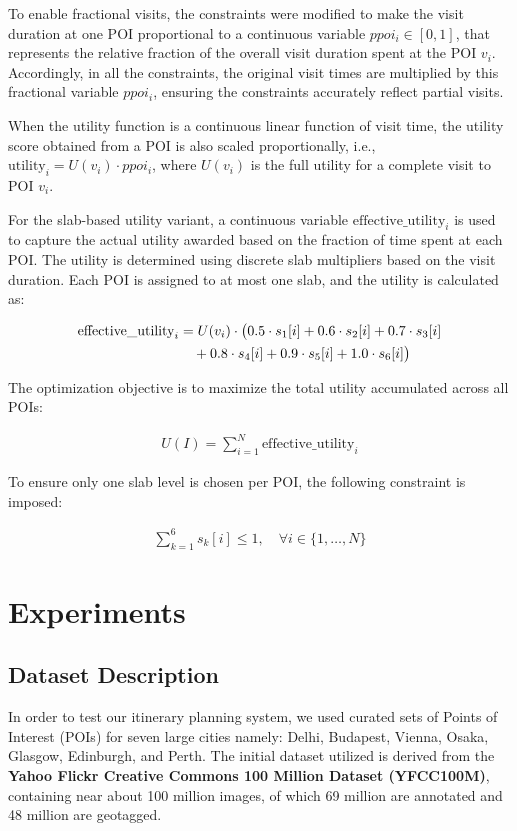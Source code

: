 \documentclass[sigconf,authordraft]{acmart}
\begin{document}
To enable fractional visits, the constraints were modified to make the visit duration at one POI proportional to a continuous variable \( ppoi_i \in [0,1] \), that represents the relative fraction of the overall visit duration spent at the POI \( v_i \). Accordingly, in all the constraints, the original visit times are multiplied by this fractional variable \( ppoi_i \), ensuring the constraints accurately reflect partial visits.

When the utility function is a continuous linear function of visit time, the utility score obtained from a POI is also scaled proportionally, i.e., \( \text{utility}_i = U(v_i) \cdot ppoi_i \), where \( U(v_i) \) is the full utility for a complete visit to POI \( v_i \).

For the slab-based utility variant, a continuous variable \( \text{effective\_utility}_i \) is used to capture the actual utility awarded based on the fraction of time spent at each POI. The utility is determined using discrete slab multipliers based on the visit duration. Each POI is assigned to at most one slab, and the utility is calculated as:

\begin{align}
\label{effective_utility}
\text{effective\_utility}_i &= U(v_i) \cdot \big(0.5 \cdot s_1[i] + 0.6 \cdot s_2[i] + 0.7 \cdot s_3[i] \notag \\
&\quad + 0.8 \cdot s_4[i] + 0.9 \cdot s_5[i] + 1.0 \cdot s_6[i] \big)
\end{align}

The optimization objective is to maximize the total utility accumulated across all POIs:

\begin{align}
\label{objective_fun_slabs}
U(I) = \sum_{i=1}^N \text{effective\_utility}_i
\end{align}

To ensure only one slab level is chosen per POI, the following constraint is imposed:

\begin{align}
\sum_{k=1}^{6} s_k[i] \leq 1, \quad \forall i \in \{1, \dots, N\}
\end{align}


\section{Experiments}
\subsection{Dataset Description}
In order to test our itinerary planning system, we used curated sets of Points of Interest (POIs) for seven large cities namely: Delhi, Budapest, Vienna, Osaka, Glasgow, Edinburgh, and Perth. The initial dataset utilized is derived from the \textbf{Yahoo Flickr Creative Commons 100 Million Dataset (YFCC100M)}, containing near about 100 million images, of which 69 million are annotated and 48 million are geotagged.
\end{document}
